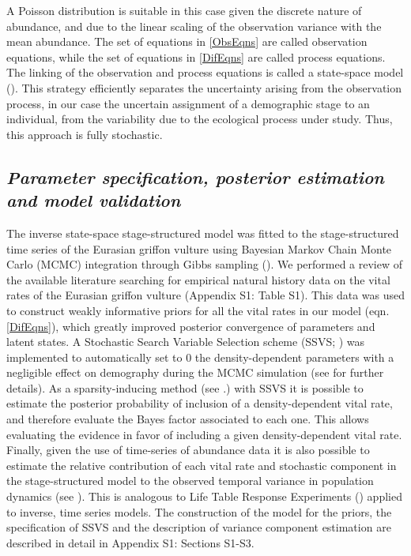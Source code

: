 \documentclass[12pt]{article}
\begin{document}
A Poisson distribution is suitable  in this case given the discrete nature of abundance, and due to the linear scaling of the observation variance with the mean abundance. The set of equations in \ref{ObsEqns} are called observation equations, while the set of equations in \ref{DifEqns} are called process equations. The linking of the observation and process equations is called a state-space model (\cite{King2010}). This strategy efficiently separates the uncertainty arising from the observation process, in our case the uncertain assignment of a demographic stage to an individual, from the variability due to the ecological process under study. Thus, this approach is fully stochastic.

\subsection*{\textit{Parameter specification, posterior estimation and model validation}}

The inverse state-space stage-structured model was fitted to the stage-structured time series of the Eurasian griffon vulture using Bayesian Markov Chain Monte Carlo (MCMC) integration through Gibbs sampling (\cite{Gelman2014}). We performed a review of the available literature searching for empirical natural history data on the vital rates of the Eurasian griffon vulture (Appendix S1: Table S1). This data was used to construct weakly informative priors for all the vital rates in our model (eqn. \ref{DifEqns}), which greatly improved posterior convergence of parameters and latent states. A Stochastic Search Variable Selection scheme (SSVS; \cite{George1993}) was implemented to automatically set to 0 the density-dependent parameters with a negligible effect on demography during the MCMC simulation (see \cite{Mutshinda2011,Almaraz2011} for further details). As a sparsity-inducing method (see \cite{Gelman2014}.) with SSVS it is possible to estimate the posterior probability of inclusion of a density-dependent vital rate, and therefore evaluate the Bayes factor associated to each one. This allows evaluating the evidence in favor of including a given density-dependent vital rate. Finally, given the use of time-series of abundance data it is also possible to estimate the relative contribution of each vital rate and stochastic component in the stage-structured model to the observed temporal variance in population dynamics (see \cite{Almaraz2011,Mutshinda2011}). This is analogous to Life Table Response Experiments (\cite{Caswell2010}) applied to inverse, time series models. The construction of the model for the priors, the specification of SSVS and the description of variance component estimation are described in detail in Appendix S1: Sections S1-S3. \\
\end{document}
